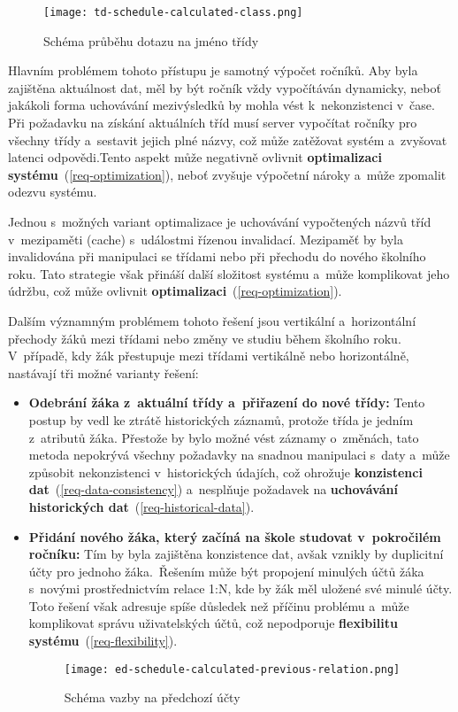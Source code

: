 \begin{enumerate}
    \begin{figure}[H]
        \centering
        \texttt{[image: td-schedule-calculated-class.png]}
        \caption{Schéma průběhu dotazu na jméno třídy}
        \label{fig:td-schedule-calculated-class}
    \end{figure}
    
    Hlavním problémem tohoto přístupu je samotný výpočet ročníků. Aby byla zajištěna aktuálnost dat, měl by být ročník vždy vypočítáván dynamicky, neboť jakákoli forma uchovávání mezivýsledků by mohla vést k~nekonzistenci v~čase. Při požadavku na získání aktuálních tříd musí server vypočítat ročníky pro všechny třídy a~sestavit jejich plné názvy, což může zatěžovat systém a~zvyšovat latenci odpovědi.Tento aspekt může negativně ovlivnit \textbf{optimalizaci systému}~(\ref{req-optimization}), neboť zvyšuje výpočetní nároky a~může zpomalit odezvu systému.

    Jednou s~možných variant optimalizace je uchovávání vypočtených názvů tříd v~mezipaměti (cache) s~událostmi řízenou invalidací. Mezipaměť by byla invalidována při manipulaci se třídami nebo při přechodu do nového školního roku. Tato strategie však přináší další složitost systému a~může komplikovat jeho údržbu, což může ovlivnit \textbf{optimalizaci}~(\ref{req-optimization}).

    Dalším významným problémem tohoto řešení jsou vertikální a~horizontální přechody žáků mezi třídami nebo změny ve studiu během školního roku. V~případě, kdy žák přestupuje mezi třídami vertikálně nebo horizontálně, nastávají tři možné varianty řešení:
    \begin{itemize}
        \item \textbf{Odebrání žáka z~aktuální třídy a~přiřazení do nové třídy:} Tento postup by vedl ke ztrátě historických záznamů, protože třída je jedním z~atributů žáka. Přestože by bylo možné vést záznamy o~změnách, tato metoda nepokrývá všechny požadavky na snadnou manipulaci s~daty a~může způsobit nekonzistenci v~historických údajích, což ohrožuje \textbf{konzistenci dat}~(\ref{req-data-consistency}) a~nesplňuje požadavek na \textbf{uchovávání historických dat}~(\ref{req-historical-data}).

        \item \textbf{Přidání nového žáka, který začíná na škole studovat v~pokročilém ročníku:} Tím by byla zajištěna konzistence dat, avšak vznikly by duplicitní účty pro jednoho žáka.~Řešením může být propojení minulých účtů žáka s~novými prostřednictvím relace 1:N, kde by žák měl uložené své minulé účty. Toto řešení však adresuje spíše důsledek než příčinu problému a~může komplikovat správu uživatelských účtů, což nepodporuje \textbf{flexibilitu systému}~(\ref{req-flexibility}).
        \begin{figure}[H]
            \centering
            \texttt{[image: ed-schedule-calculated-previous-relation.png]}
            \caption{Schéma vazby na předchozí účty}
            \label{fig:ed-schedule-calculated-previous-relation}
        \end{figure}


\end{itemize}
\end{enumerate}
